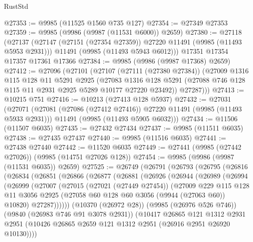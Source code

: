\begin{lexlean}{RustStd}
\begin{coremodule}
@27353 := @9985 (@11525 @1560 @735 @127)
@27354 := @27349 @27353
@27359 := @9985 (@9986 (@9987 (@11531 @6000)) @2659)
@27380 := @27118
    (@27137
      (@27147 (@27151 (@27354 @27359)) @27220 @11491 (@9985 (@11493 @5953 @2931)))
      @11491
      (@9985 (@11493 @5943 @6012)))
    @17351
    @17354
    @17357
    @17361
    @17366
@27384 := @9985 (@9986 (@9987 @17368) @2659)
@27412 := @27096
    (@27101
      (@27107
        (@27111 (@27380 @27384))
        (@27009
          @1316
          @115
          @128
          @11
          @5291
          @2925
          (@27083
            @1316
            @128
            @5291
            (@27088 @746 @128 @115 @11 @2931 @2925 @5289 @10177 @27220 @23492))
          @27287)))
@27413 := @10215 @751
@27416 := @10213 (@27413 @128 @5937)
@27432 := @27031
    (@27071
      (@27081 (@27086 (@27412 @27416)) @27220 @11491 (@9985 (@11493 @5933 @2931)))
      @11491
      (@9985 (@11493 @5905 @6032)))
@27434 := @11506 (@11507 @6035)
@27435 := @27432 @27434
@27437 := @9985 (@11511 @6035)
@27438 := @27435 @27437
@27440 := @9985 (@11516 @6035)
@27441 := @27438 @27440
@27442 := @11520 @6035
@27449 := @27441 (@9985 (@27442 @27026)) (@9985 (@14751 @27026 @128))
@27454 := @9985 (@9986 (@9987 (@11531 @6035)) @2659)
@27525 := @26749
    (@26791
      (@26793
        (@26795
          (@26816
            (@26834
              (@26851
                (@26866
                  (@26877
                    (@26881
                      (@26926
                        (@26944
                          (@26989
                            (@26994
                              (@26999
                                (@27007
                                  (@27015
                                    (@27021 (@27449 @27454))
                                    (@27009
                                      @229
                                      @115
                                      @128
                                      @11
                                      @3056
                                      @2925
                                      (@27058 @60 @128 @60 @3056 (@9944 (@27063 @60)) @10820)
                                      @27287))))))
                          (@10370 (@26972 @28))
                          (@9985 (@26976 @526 @746))
                          (@9840 (@26983 @746 @91 @3078 @2931))
                          (@10417
                            @26865
                            @121
                            @1312
                            @2931
                            @2951
                            (@10426 @26865 @2659 @121 @1312 @2951 (@26916 @2951 @26920 @10130))))

\end{coremodule}
\end{lexlean}
